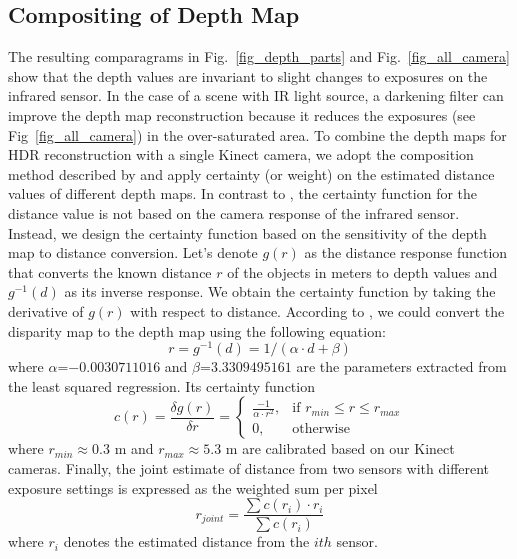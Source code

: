 \subsection{Compositing of Depth Map}
The resulting comparagrams in Fig.~\ref{fig_depth_parts} and Fig.~\ref{fig_all_camera} show that the depth values are invariant to slight changes to exposures on the infrared sensor. In the case of a scene with IR light source, a darkening filter can improve the depth map reconstruction because it reduces the exposures (see Fig~\ref{fig_all_camera}) in the over-saturated area. To combine the depth maps for HDR reconstruction with a single Kinect camera, we adopt the composition method described by \cite{mannwyckofftr} and apply certainty (or weight) on the estimated distance values of different depth maps. In contrast to \cite{mannwyckofftr}, the certainty function for the distance value is not based on the camera response of the infrared sensor. Instead, we design the certainty function based on the sensitivity of the depth map to distance conversion. Let's denote $g(r)$ as the distance response function that converts the known distance $r$ of the objects in meters to depth values and $g^{-1}(d)$ as its inverse response. We obtain the certainty function by taking the derivative of $g(r)$ with respect to distance. According to \cite{mann2011blind}, we could convert the disparity map to the depth map using the following equation:
\begin{equation}
r = g^{-1}(d) = 1/(\alpha \cdot d + \beta)
\end{equation} 
where $\alpha$=$-0.0030711016$ and $\beta$=$3.3309495161$ are the parameters extracted from the least squared regression. Its certainty function \begin{equation}
c(r) = \frac{\delta g(r)}{\delta r} = 
\begin{cases} \frac{-1}{\alpha \cdot r^2}, 
			& \mbox{if } r_{min} \le r \le r_{max} \\
			0, & \mbox{otherwise}
 \end{cases}
\end{equation}
where $r_{min}$$\approx$$0.3$ m and $r_{max}$$\approx$$5.3$ m are calibrated based on our Kinect cameras.
Finally, the joint estimate of distance from two sensors with different exposure settings is expressed as the weighted sum per pixel
\begin{equation}
r_{joint} = \frac{\sum c(r_i) \cdot r_i}{\sum c(r_i)}
\label{eq_depth_sum}
\end{equation}
where $r_i$ denotes the estimated distance from the $ith$ sensor.
